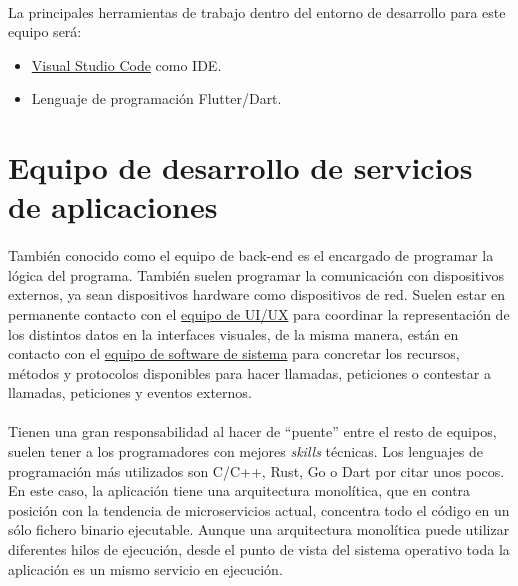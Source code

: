 \paragraph{}La principales herramientas de trabajo dentro del entorno de desarrollo para este equipo
será:

\begin{itemize}
    \item \hyperref[sec:vscode]{Visual Studio Code} como \gls{IDE}.
    \item Lenguaje de programación Flutter/Dart.
\end{itemize}

\section{Equipo de desarrollo de servicios de aplicaciones}

\paragraph{}También conocido como el equipo de \gls{back-end} es el encargado de programar
la lógica del programa. También suelen programar la comunicación con dispositivos externos,
ya sean dispositivos hardware como dispositivos de red. Suelen estar en permanente
contacto con el \hyperref[sec:uiteam]{equipo de UI/UX} para coordinar la representación
de los distintos datos en la interfaces visuales, de la misma manera, están en contacto
con el \hyperref[sec:systemteam]{equipo de software de sistema} para concretar los
recursos, métodos y protocolos disponibles para hacer llamadas, peticiones o contestar
a llamadas, peticiones y eventos externos.

\paragraph{}Tienen una gran responsabilidad al hacer de ``puente'' entre el resto de
equipos, suelen tener a los programadores con mejores \emph{skills} técnicas. Los
lenguajes de programación más utilizados son C/C++, Rust, Go o Dart por citar unos pocos.
En este caso, la aplicación tiene una arquitectura monolítica, que en contra posición
con la tendencia de microservicios actual, concentra todo el código en un sólo fichero
binario ejecutable. Aunque una arquitectura monolítica puede utilizar diferentes hilos
de ejecución, desde el punto de vista del sistema operativo toda la aplicación es un
mismo servicio en ejecución.

